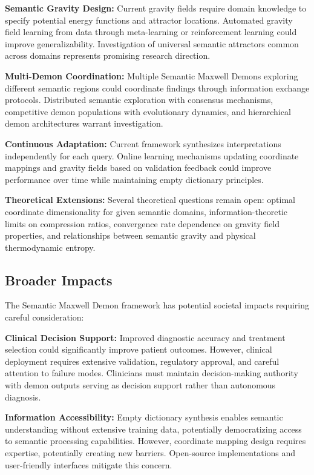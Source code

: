 \documentclass[12pt,a4paper]{article}
\begin{document}
\textbf{Semantic Gravity Design:} Current gravity fields require domain knowledge to specify potential energy functions and attractor locations. Automated gravity field learning from data through meta-learning or reinforcement learning could improve generalizability. Investigation of universal semantic attractors common across domains represents promising research direction.

\textbf{Multi-Demon Coordination:} Multiple Semantic Maxwell Demons exploring different semantic regions could coordinate findings through information exchange protocols. Distributed semantic exploration with consensus mechanisms, competitive demon populations with evolutionary dynamics, and hierarchical demon architectures warrant investigation.

\textbf{Continuous Adaptation:} Current framework synthesizes interpretations independently for each query. Online learning mechanisms updating coordinate mappings and gravity fields based on validation feedback could improve performance over time while maintaining empty dictionary principles.

\textbf{Theoretical Extensions:} Several theoretical questions remain open: optimal coordinate dimensionality for given semantic domains, information-theoretic limits on compression ratios, convergence rate dependence on gravity field properties, and relationships between semantic gravity and physical thermodynamic entropy.

\subsection{Broader Impacts}

The Semantic Maxwell Demon framework has potential societal impacts requiring careful consideration:

\textbf{Clinical Decision Support:} Improved diagnostic accuracy and treatment selection could significantly improve patient outcomes. However, clinical deployment requires extensive validation, regulatory approval, and careful attention to failure modes. Clinicians must maintain decision-making authority with demon outputs serving as decision support rather than autonomous diagnosis.

\textbf{Information Accessibility:} Empty dictionary synthesis enables semantic understanding without extensive training data, potentially democratizing access to semantic processing capabilities. However, coordinate mapping design requires expertise, potentially creating new barriers. Open-source implementations and user-friendly interfaces mitigate this concern.
\end{document}
